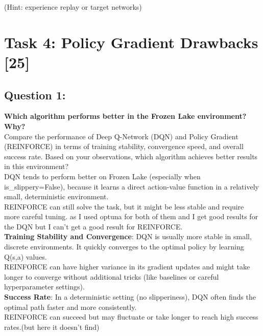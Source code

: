 \documentclass[12pt]{article}
\begin{document}
{{{				(Hint: experience replay or target networks)
				\vspace*{0.3cm}
				
				\newpage
				
				\section{Task 4: Policy Gradient Drawbacks [25]}
				
				\subsection{Question 1:}
				\textbf{Which algorithm performs better in the Frozen Lake environment? Why?}\\ 
				\newline
				Compare the performance of Deep Q-Network (DQN) and Policy Gradient (REINFORCE) in terms of training stability, convergence speed, and overall success rate. Based on your observations, which algorithm achieves better results in this environment?\\
				DQN tends to perform better on Frozen Lake (especially when is_slippery=False), because it learns a direct action-value function in a relatively small, deterministic environment.\\
				REINFORCE can still solve the task, but it might be less stable and require more careful tuning. 
				as I used optuna for both of them and I get good results for the DQN but I can't get a good result for REINFORCE.\\
				
				\textbf{Training Stability and Convergence}:
				DQN is usually more stable in small, discrete environments. It quickly converges to the optimal policy by learning Q(s,a) values.\\
				REINFORCE can have higher variance in its gradient updates and might take longer to converge without additional tricks (like baselines or careful hyperparameter settings).\\
				\textbf{Success Rate}:
				In a deterministic setting (no slipperiness), DQN often finds the optimal path faster and more consistently.\\
				REINFORCE can succeed but may fluctuate or take longer to reach high success rates.(but here it doesn't find)
				
}}}
\end{document}
